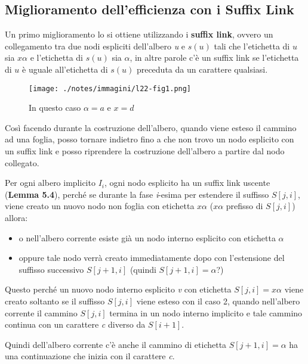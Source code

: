 
\subsection{Miglioramento dell'efficienza con i Suffix Link}

Un primo miglioramento lo si ottiene utilizzando i \textbf{suffix link}, ovvero un collegamento tra due nodi espliciti dell'albero \textit{u} e $ s(u) $ tali che l'etichetta di $ u $ sia $ x\alpha $ e l'etichetta di $ s(u) $ sia $ \alpha $, in altre parole c'è un suffix link se l'etichetta di $ u $ è uguale all'etichetta di $ s(u) $ preceduta da un carattere qualsiasi.

\begin{figure}[htbp]
	\centering
	\texttt{[image: ./notes/immagini/l22-fig1.png]}
	\caption{In questo caso $\alpha=a$ e $x=d$}
\end{figure}

Così facendo durante la costruzione dell'albero, quando viene esteso il cammino ad una foglia, posso tornare indietro fino a che non trovo un nodo esplicito con un suffix link e posso riprendere la costruzione dell'albero a partire dal nodo collegato.

Per ogni albero implicito $ I_i $, ogni nodo esplicito ha un suffix link uscente (\textbf{Lemma 5.4}), perché se durante la fase \textit{i}-esima per estendere il suffisso $ S[j,i] $, viene creato un nuovo nodo non foglia con etichetta $ x\alpha $ ($x\alpha$ prefisso di $ S[j,i] $) allora:
\begin{itemize}
	\item o nell'albero corrente esiste già un nodo interno esplicito con etichetta $\alpha$
	\item oppure tale nodo verrà creato immediatamente dopo con l'estensione del suffisso successivo $ S[j+1,i] $ (quindi $S[j+1,i] = \alpha $?)
\end{itemize}

Questo perché un nuovo nodo interno esplicito \textit{v} con etichetta $ S[j,i] = x\alpha $ viene creato soltanto se il suffisso $ S[j,i] $ viene esteso con il caso 2, quando nell'albero corrente il cammino $ S[j,i] $ termina in un nodo interno implicito e tale cammino continua con un carattere \textit{c} diverso da $S[i+1]$.

Quindi dell'albero corrente c'è anche il cammino di etichetta $S[j+1,i] = \alpha$ ha una continuazione che inizia con il carattere \textit{c}.

